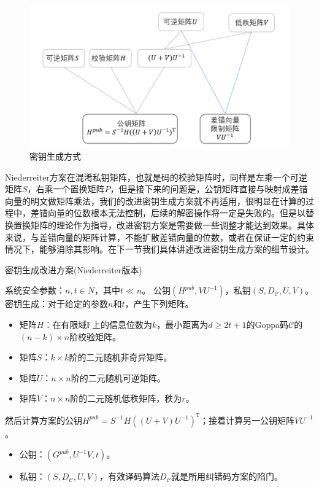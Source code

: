\begin{figure}[H]
	\centering
	\includegraphics[width=12 cm]{fig/keygenmethodN.pdf}
	\caption{密钥生成方式} %
	\label{fig:keygenmethodN_pdf}
\end{figure}

Niederreiter方案在混淆私钥矩阵，也就是码的校验矩阵时，同样是左乘一个可逆矩阵$S$，右乘一个置换矩阵$P$，但是接下来的问题是，公钥矩阵直接与映射成差错向量的明文做矩阵乘法，我们的改进密钥生成方案就不再适用，很明显在计算的过程中，差错向量的位数根本无法控制，后续的解密操作将一定是失败的。但是以替换置换矩阵的理论作为指导，改进密钥方案是需要做一些调整才能达到效果。具体来说，与差错向量的矩阵计算，不能扩散差错向量的位数，或者在保证一定的约束情况下，能够消除其影响。在下一节我们具体讲述改进密钥生成方案的细节设计。

\begin{breakablealgorithm}
	\small
	\renewcommand{\algorithmicrequire}{\textbf{Input:}}
	\renewcommand{\algorithmicensure}{\textbf{Output:}}
	\caption{密钥生成改进方案(Niederreiter版本)}
	\label{alg:NewKeyGenN}
	\begin{algorithmic}[1]
		\Require
		系统安全参数：$n,t \in N$，其中$t \ll n$。
		\Ensure
		公钥$(H^{pub},VU^{-1})$，私钥$(S,D_\mathcal{C},U,V)$。
		\State
		密钥生成：对于给定的参数$n$和$t$，产生下列矩阵。
		\begin{itemize}
			\item 矩阵$H$：在有限域$\mathbb{F}$上的信息位数为$k$，最小距离为$d \geq 2t + 1$的Goppa码$\mathcal{C}$的$(n - k) \times n$阶校验矩阵。
			\item 矩阵$S$：$k \times k$阶的二元随机非奇异矩阵。
			\item 矩阵$U$：$n \times n$阶的二元随机可逆矩阵。
			\item 矩阵$V$：$n \times n$阶的二元随机低秩矩阵，秩为$r$。
		\end{itemize}
		\State
		然后计算方案的公钥$H^{pub} = S^{-1}H((U + V)U^{-1})^\mathtt{T}$；接着计算另一公钥矩阵$VU^{-1}$。
		\begin{itemize}
			\item 公钥：$(G^{pub},U^{-1}V,t)$。
			\item 私钥：$(S,D_\mathcal{C},U,V)$，有效译码算法$D_\mathcal{C}$就是所用纠错码方案的陷门。
		\end{itemize}
	\end{algorithmic}
\end{breakablealgorithm}

